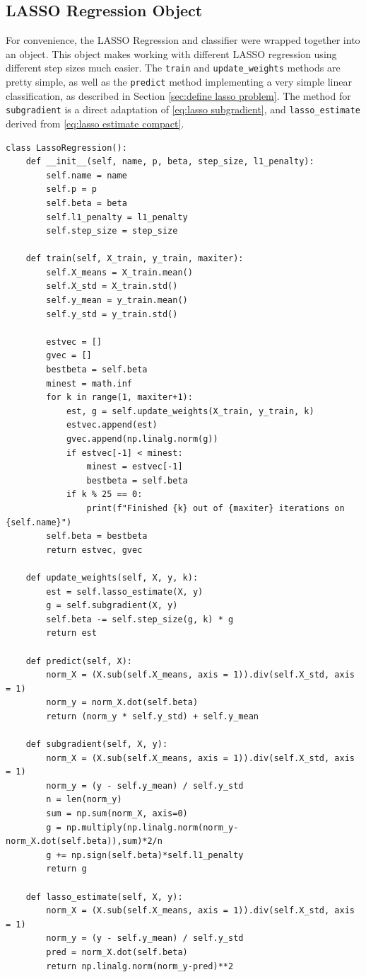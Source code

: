 \documentclass[journal,onecolumn]{IEEEtran}
\begin{document}
\subsection{LASSO Regression Object}
For convenience, the LASSO Regression and classifier were wrapped together into an object. This object makes working with different LASSO regression using different step sizes much easier. The \verb|train| and \verb|update_weights| methods are pretty simple, as well as the \verb|predict| method implementing a very simple linear classification, as described in Section \ref{sec:define lasso problem}. The method for \verb|subgradient| is a direct adaptation of \eqref{eq:lasso subgradient}, and \verb|lasso_estimate| derived from \eqref{eq:lasso estimate compact}.
\begin{verbatim}
class LassoRegression():
    def __init__(self, name, p, beta, step_size, l1_penalty):
        self.name = name
        self.p = p
        self.beta = beta
        self.l1_penalty = l1_penalty
        self.step_size = step_size
    
    def train(self, X_train, y_train, maxiter):
        self.X_means = X_train.mean()
        self.X_std = X_train.std()
        self.y_mean = y_train.mean()
        self.y_std = y_train.std()

        estvec = []
        gvec = []
        bestbeta = self.beta
        minest = math.inf
        for k in range(1, maxiter+1):
            est, g = self.update_weights(X_train, y_train, k)
            estvec.append(est)
            gvec.append(np.linalg.norm(g))
            if estvec[-1] < minest:
                minest = estvec[-1]
                bestbeta = self.beta
            if k % 25 == 0:
                print(f"Finished {k} out of {maxiter} iterations on {self.name}")
        self.beta = bestbeta
        return estvec, gvec

    def update_weights(self, X, y, k):
        est = self.lasso_estimate(X, y)
        g = self.subgradient(X, y)
        self.beta -= self.step_size(g, k) * g
        return est

    def predict(self, X):
        norm_X = (X.sub(self.X_means, axis = 1)).div(self.X_std, axis = 1)
        norm_y = norm_X.dot(self.beta)
        return (norm_y * self.y_std) + self.y_mean
    
    def subgradient(self, X, y):
        norm_X = (X.sub(self.X_means, axis = 1)).div(self.X_std, axis = 1)
        norm_y = (y - self.y_mean) / self.y_std
        n = len(norm_y)
        sum = np.sum(norm_X, axis=0)
        g = np.multiply(np.linalg.norm(norm_y-norm_X.dot(self.beta)),sum)*2/n
        g += np.sign(self.beta)*self.l1_penalty
        return g
    
    def lasso_estimate(self, X, y):
        norm_X = (X.sub(self.X_means, axis = 1)).div(self.X_std, axis = 1)
        norm_y = (y - self.y_mean) / self.y_std
        pred = norm_X.dot(self.beta)
        return np.linalg.norm(norm_y-pred)**2
\end{verbatim}
\end{document}
